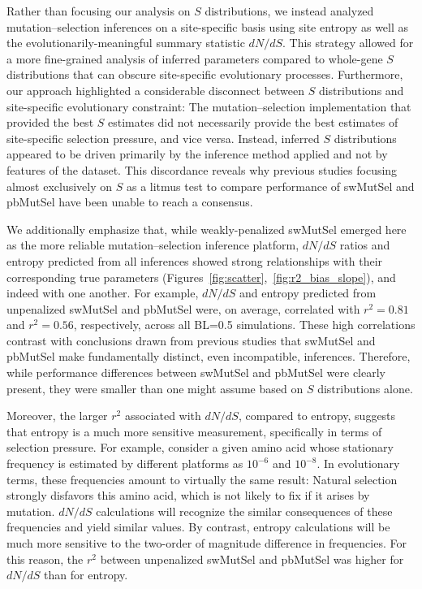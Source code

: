 \documentclass[11pt]{article}
\begin{document}
Rather than focusing our analysis on $S$ distributions, we instead analyzed mutation--selection inferences on a site-specific basis using site entropy as well as the evolutionarily-meaningful summary statistic $dN/dS$. This strategy allowed for a more fine-grained analysis of inferred parameters compared to whole-gene $S$ distributions that can obscure site-specific evolutionary processes. Furthermore, our approach highlighted a considerable disconnect between $S$ distributions and site-specific evolutionary constraint: The mutation--selection implementation that provided the best $S$ estimates did not necessarily provide the best estimates of site-specific selection pressure, and vice versa. Instead, inferred $S$ distributions appeared to be driven primarily by the inference method applied and not by features of the dataset. This discordance reveals why previous studies focusing almost exclusively on $S$ as a litmus test to compare performance of swMutSel and pbMutSel have been unable to reach a consensus.

We additionally emphasize that, while weakly-penalized swMutSel emerged here as the more reliable mutation--selection inference platform, $dN/dS$ ratios and entropy predicted from all inferences showed strong relationships with their corresponding true parameters (Figures~\ref{fig:scatter},~\ref{fig:r2_bias_slope}), and indeed with one another. For example, $dN/dS$ and entropy predicted from unpenalized swMutSel and pbMutSel were, on average, correlated with $r^2=0.81$ and $r^2=0.56$, respectively, across all BL=0.5 simulations. These high correlations contrast with conclusions drawn from previous studies that swMutSel and pbMutSel make fundamentally distinct, even incompatible, inferences. Therefore, while performance differences between swMutSel and pbMutSel were clearly present, they were smaller than one might assume based on $S$ distributions alone.

Moreover, the larger $r^2$ associated with $dN/dS$, compared to entropy, suggests that entropy is a much more sensitive measurement, specifically in terms of selection pressure. For example, consider a given amino acid whose stationary frequency is estimated by different platforms as $10^{-6}$ and $10^{-8}$. In evolutionary terms, these frequencies amount to virtually the same result: Natural selection strongly disfavors this amino acid, which is not likely to fix if it arises by mutation. $dN/dS$ calculations will recognize the similar consequences of these frequencies and yield similar values. By contrast, entropy calculations will be much more sensitive to the two-order of magnitude difference in frequencies. For this reason, the $r^2$ between unpenalized swMutSel and pbMutSel was higher for $dN/dS$ than for entropy.
\end{document}
